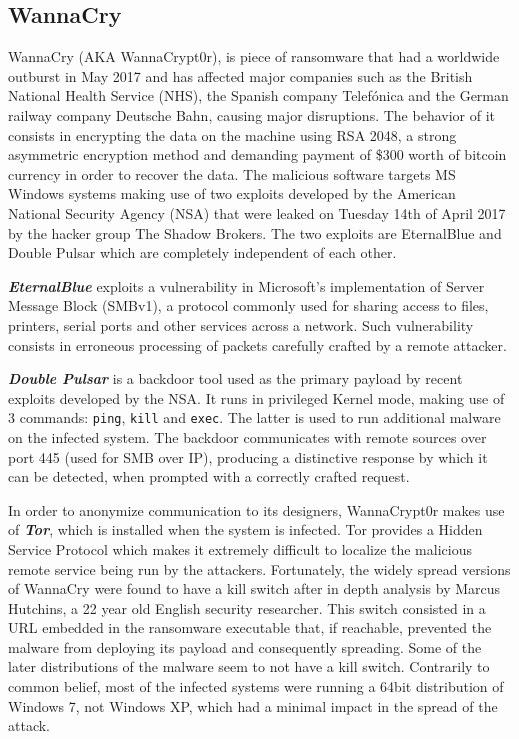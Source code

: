 \documentclass[10pt,a4paper]{article}
\begin{document}
\subsection{WannaCry}
WannaCry (AKA WannaCrypt0r), is piece of ransomware that had a worldwide outburst in May 2017 and has affected major companies such as the British National Health Service (NHS), the Spanish company Telefónica and the German railway company Deutsche Bahn, causing major disruptions. The behavior of it consists in encrypting the data on the machine using RSA 2048, a strong asymmetric encryption method and demanding payment of \$300 worth of bitcoin currency in order to recover the data. The malicious software targets MS Windows systems making use of two exploits developed by the American National Security Agency (NSA) that were leaked on Tuesday 14th of April 2017 by the hacker group The Shadow Brokers. The two exploits are EternalBlue and Double Pulsar which are completely independent of each other.

\textbf{\textit{EternalBlue}} exploits a vulnerability in Microsoft's implementation of Server Message Block (SMBv1), a protocol commonly used for sharing access to files, printers, serial ports and other services across a network. Such vulnerability consists in erroneous processing of packets carefully crafted by a remote attacker.

\textbf{\textit{Double Pulsar}} is a backdoor tool used as the primary payload by recent exploits developed by the NSA. It runs in privileged Kernel mode, making use of 3 commands: \texttt{ping}, \texttt{kill} and \texttt{exec}. The latter is used to run additional malware on the infected system. The backdoor communicates with remote sources over port 445 (used for SMB over IP), producing a distinctive response by which it can be detected, when prompted with a correctly crafted request.

In order to anonymize communication to its designers, WannaCrypt0r makes use of \textit{\textbf{Tor}}, which is installed when the system is infected. Tor provides a Hidden Service Protocol which makes it extremely difficult to localize the malicious remote service being run by the attackers.
Fortunately, the widely spread versions of WannaCry were found to have a kill switch after in depth analysis by Marcus Hutchins, a 22 year old English security researcher. This switch consisted in a URL  embedded in the ransomware executable that, if reachable, prevented the malware from deploying its payload and consequently spreading. Some of the later distributions of the malware seem to not have a kill switch. Contrarily to common belief, most of the infected systems were running a 64bit distribution of Windows 7, not Windows XP, which had a minimal impact in the spread of the attack.
\end{document}
